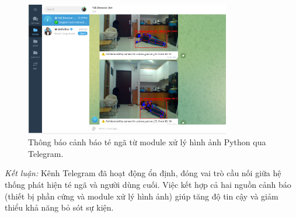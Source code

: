 \begin{figure}[H]
    \centering
    \includegraphics[width=0.8\textwidth]{figures/telegram_python_fall_send.png}
    \caption{Thông báo cảnh báo té ngã từ module xử lý hình ảnh Python qua Telegram.}
    \label{fig:telegram_python}
\end{figure}

\textit{Kết luận:} Kênh Telegram đã hoạt động ổn định, đóng vai trò cầu nối giữa hệ thống phát hiện té ngã và người dùng cuối. Việc kết hợp cả hai nguồn cảnh báo (thiết bị phần cứng và module xử lý hình ảnh) giúp tăng độ tin cậy và giảm thiểu khả năng bỏ sót sự kiện.
